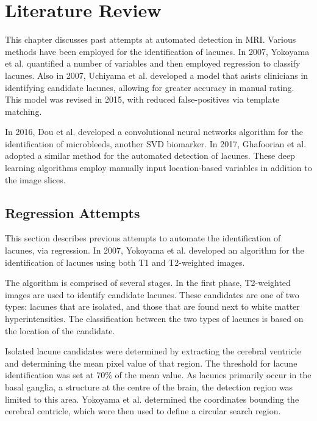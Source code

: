 \documentclass[honours,12pt]{unswthesis}
\numberwithin{equation}{section}
\begin{document}
\chapter{Literature Review}\label{litrev-intro}

This chapter discusses past attempts at automated detection in MRI. Various methods have been employed for the identification of lacunes. In 2007, Yokoyama et al. \cite{Yokoyama2007} quantified a number of variables and then employed regression to classify lacunes. Also in 2007, Uchiyama et al. \cite{Uchiyama20071554} developed a model that asists clinicians in identifying candidate lacunes, allowing for greater accuracy in manual rating. This model was revised in 2015\cite{Uchiyama2015}, with reduced false-positives via template matching.

In 2016, Dou et al. \cite{DouQ.2016ADoC} developed a convolutional neural networks algorithm for the identification of microbleeds, another SVD biomarker. In 2017, Ghafoorian et al. \cite{GhafoorianM.2017Dml3} adopted a similar method for the automated detection of lacunes. These deep learning algorithms employ manually input location-based variables in addition to the image slices.



\section{Regression Attempts}\label{litrev-reg}

This section describes previous attempts to automate the identification of lacunes, via regression. In 2007, Yokoyama et al. \cite{Yokoyama2007} developed an algorithm for the identification of lacunes using both T1 and T2-weighted images.


The algorithm is comprised of several stages. In the first phase, T2-weighted images are used to identify candidate lacunes. These candidates are one of two types: lacunes that are isolated, and those that are found next to white matter hyperintensities. The classification between the two types of lacunes is based on the location of the candidate.


Isolated lacune candidates were determined by extracting the cerebral ventricle and determining the mean pixel value of that region. The threshold for lacune identification was set at 70\% of the mean value. As lacunes primarily occur in the basal ganglia, a structure at the centre of the brain, the detection region was limited to this area. Yokoyama et al. determined the coordinates bounding the cerebral centricle, which were then used to define a circular search region.
\end{document}
